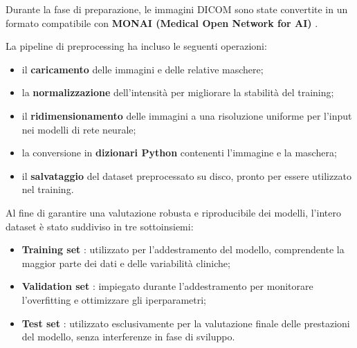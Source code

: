 Durante la fase di preparazione, le immagini DICOM sono state convertite in un formato compatibile con \textbf{MONAI (Medical Open Network for AI)} \cite{cardoso2022monai}.



La pipeline di preprocessing ha incluso le seguenti operazioni:
\begin{itemize}
\item il \textbf{caricamento} delle immagini e delle relative maschere;
\item la \textbf{normalizzazione} dell’intensità per migliorare la stabilità del training;
\item il \textbf{ridimensionamento} delle immagini a una risoluzione uniforme per l’input nei modelli di rete neurale;
\item la conversione in \textbf{dizionari Python} contenenti l'immagine e la maschera;
\item il \textbf{salvataggio} del dataset preprocessato su disco, pronto per essere utilizzato nel training.
\end{itemize}



Al fine di garantire una valutazione robusta e riproducibile dei modelli, l'intero dataset è stato suddiviso in tre sottoinsiemi:
\begin{itemize}
\item \textbf{Training set} : utilizzato per l'addestramento del modello, comprendente la maggior parte dei dati e delle variabilità cliniche;
\item \textbf{Validation set} : impiegato durante l’addestramento per monitorare l’overfitting e ottimizzare gli iperparametri;
\item \textbf{Test set} : utilizzato esclusivamente per la valutazione finale delle prestazioni del modello, senza interferenze in fase di sviluppo.
\end{itemize}

